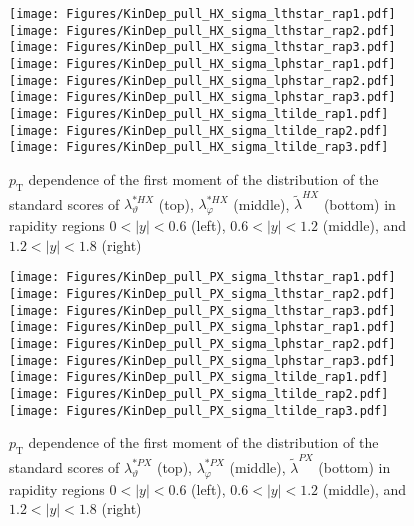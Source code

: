 \documentclass[12pt]{article}
\newcommand{\pT}{p_\mathrm{T}}
\newcommand{\absy}{\left |  y \right |}
\newcommand{\lamtildeHX}{\tilde{\lambda}^{\scriptscriptstyle HX}}
\newcommand{\lamthstarHX}{\lambda^{* \scriptscriptstyle HX}_\vartheta}
\newcommand{\lamphstarHX}{\lambda^{* \scriptscriptstyle HX}_\varphi}
\newcommand{\lamtildePX}{\tilde{\lambda}^{\scriptscriptstyle PX}}
\newcommand{\lamthstarPX}{\lambda^{* \scriptscriptstyle PX}_\vartheta}
\newcommand{\lamphstarPX}{\lambda^{* \scriptscriptstyle PX}_\varphi}
\begin{document}
\begin{figure}[htbp]
\centering
\texttt{[image: Figures/KinDep\_pull\_HX\_sigma\_lthstar\_rap1.pdf]}
\texttt{[image: Figures/KinDep\_pull\_HX\_sigma\_lthstar\_rap2.pdf]}
\texttt{[image: Figures/KinDep\_pull\_HX\_sigma\_lthstar\_rap3.pdf]}
\texttt{[image: Figures/KinDep\_pull\_HX\_sigma\_lphstar\_rap1.pdf]}
\texttt{[image: Figures/KinDep\_pull\_HX\_sigma\_lphstar\_rap2.pdf]}
\texttt{[image: Figures/KinDep\_pull\_HX\_sigma\_lphstar\_rap3.pdf]}
\texttt{[image: Figures/KinDep\_pull\_HX\_sigma\_ltilde\_rap1.pdf]}
\texttt{[image: Figures/KinDep\_pull\_HX\_sigma\_ltilde\_rap2.pdf]}
\texttt{[image: Figures/KinDep\_pull\_HX\_sigma\_ltilde\_rap3.pdf]}
\caption{$\pT$ dependence of the first moment of the distribution of the
standard scores of $\lamthstarHX$ (top), $\lamphstarHX$ (middle), $\lamtildeHX$ (bottom) in rapidity
regions $0<\absy<0.6$ (left), $0.6<\absy<1.2$ (middle), and $1.2<\absy<1.8$ (right)}
\end{figure}
\clearpage


\begin{figure}[htbp]
\centering
\texttt{[image: Figures/KinDep\_pull\_PX\_sigma\_lthstar\_rap1.pdf]}
\texttt{[image: Figures/KinDep\_pull\_PX\_sigma\_lthstar\_rap2.pdf]}
\texttt{[image: Figures/KinDep\_pull\_PX\_sigma\_lthstar\_rap3.pdf]}
\texttt{[image: Figures/KinDep\_pull\_PX\_sigma\_lphstar\_rap1.pdf]}
\texttt{[image: Figures/KinDep\_pull\_PX\_sigma\_lphstar\_rap2.pdf]}
\texttt{[image: Figures/KinDep\_pull\_PX\_sigma\_lphstar\_rap3.pdf]}
\texttt{[image: Figures/KinDep\_pull\_PX\_sigma\_ltilde\_rap1.pdf]}
\texttt{[image: Figures/KinDep\_pull\_PX\_sigma\_ltilde\_rap2.pdf]}
\texttt{[image: Figures/KinDep\_pull\_PX\_sigma\_ltilde\_rap3.pdf]}
\caption{$\pT$ dependence of the first moment of the distribution of the
standard scores of $\lamthstarPX$ (top), $\lamphstarPX$ (middle), $\lamtildePX$ (bottom) in rapidity
regions $0<\absy<0.6$ (left), $0.6<\absy<1.2$ (middle), and $1.2<\absy<1.8$ (right)}
\end{figure}
\clearpage
\end{document}
